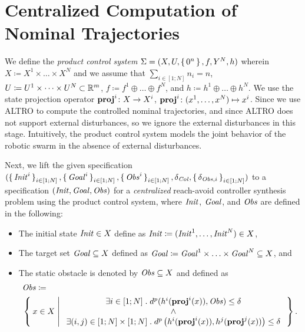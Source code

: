
\section{Centralized Computation of Nominal Trajectories}\label{sec:nominal trajectory}
We define the \emph{product control system} $\Sigma = (X, U, \set{0^n}, f, Y^N, h)$ wherein $X\coloneqq X^1\times \ldots \times X^N$ and we assume that $\sum_{i\in [1;N]} n_i=n$, $U\coloneqq U^1\times\dots\times U^N\subset \mathbb{R}^m$, $f\coloneqq f^{1}\oplus \ldots\oplus f^{N}$, and $h\coloneqq h^1\oplus \ldots \oplus h^N$. 
We use the state projection operator $\mathbf{proj}^{i}\colon X\to X^i$, $\mathbf{proj}^{i}\colon (x^1,\ldots,x^N)\mapsto x^i$.
Since we use ALTRO to compute the controlled nominal trajectories, and since ALTRO does not support external disturbances, so we ignore the external disturbances in this stage.
Intuitively, the product control system models the joint behavior of the robotic swarm in the absence of external disturbances.

Next, we lift the given specification $(\set{\mathit{Init}^i}_{i\in [1;N]}, \set{\mathit{Goal}^i}_{i\in [1;N]}, \set{\mathit{Obs}^i}_{i\in [1;N]}, \delta_{\mathit{Col}}, \set{\delta_{\mathit{Obs},i}}_{i\in [1;N]})$ to a specification $(\mathit{Init}, \mathit{Goal}, \mathit{Obs})$ for a \emph{centralized} reach-avoid controller synthesis problem using the product control system, where $\mathit{Init}$, $\mathit{Goal}$, and $\mathit{Obs}$ are defined in the following:
\begin{itemize}
	\item The initial state $\mathit{Init}\in X$ define as $\mathit{Init} \coloneqq (\mathit{Init}^1, \ldots, \mathit{Init}^N) \in X$,
	\item The target set $\mathit{Goal}\subseteq X$ defined as $\mathit{Goal} \coloneqq \mathit{Goal}^1\times \ldots \times \mathit{Goal}^N \subseteq X$, and
	\item The static obstacle is denoted by $\mathit{Obs}\subseteq X$ and defined as 
		\begin{align}
			&\mathit{Obs} \coloneqq\\ 
				&\Set{ x\in X | 
					\begin{array}{c}
						\exists i\in [1;N]\;.\; d^{p}(h^i(\mathbf{proj}^i(x)),\mathit{Obs}) \leq \delta\\
						\wedge\\
						 \exists (i,j)\in [1;N]\times [1;N]\;.\; d^{p}\left(h^i(\mathbf{proj}^i(x)),h^j(\mathbf{proj}^j(x))\right)\leq\delta
					\end{array}}.
		\end{align}
\end{itemize}

